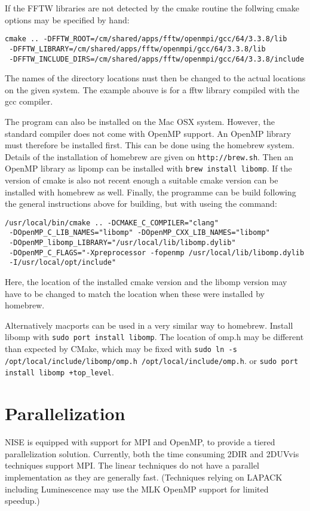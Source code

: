 \documentclass[12pt]{book}
\begin{document}
If the FFTW libraries are not detected by the cmake routine the follwing cmake options may be specified by hand:
\begin{verbatim}
cmake .. -DFFTW_ROOT=/cm/shared/apps/fftw/openmpi/gcc/64/3.3.8/lib
 -DFFTW_LIBRARY=/cm/shared/apps/fftw/openmpi/gcc/64/3.3.8/lib
 -DFFTW_INCLUDE_DIRS=/cm/shared/apps/fftw/openmpi/gcc/64/3.3.8/include
\end{verbatim}
The names of the directory locations nust then be changed to the actual locations on the given system.  The example abouve is for a fftw library compiled with the gcc compiler.

The program can also be installed on the Mac OSX system. However, the standard compiler does not come with OpenMP support. An OpenMP library must therefore be installed first. This can be done using the homebrew system. Details of the installation of homebrew are given on \texttt{http://brew.sh}. Then an OpenMP library as lipomp can be installed with \texttt{brew install libomp}. If the version of cmake is also not recent enough a suitable cmake version can be installed with homebrew as well. Finally, the programme can be build following the general instructions above for building, but with useing the command:\\
\begin{verbatim}
/usr/local/bin/cmake .. -DCMAKE_C_COMPILER="clang"
 -DOpenMP_C_LIB_NAMES="libomp" -DOpenMP_CXX_LIB_NAMES="libomp"
 -DOpenMP_libomp_LIBRARY="/usr/local/lib/libomp.dylib"
 -DOpenMP_C_FLAGS="-Xpreprocessor -fopenmp /usr/local/lib/libomp.dylib
 -I/usr/local/opt/include"
\end{verbatim}
Here, the location of the installed cmake version and the libomp version may have to be changed to match the location when these were installed by homebrew.

Alternatively macports can be used in a very similar way to homebrew. Install libomp with \texttt{sudo port install libomp}. The location of omp.h may be different than expected by CMake, which may be fixed with \texttt{sudo ln -s /opt/local/include/libomp/omp.h /opt/local/include/omp.h}. or \texttt{sudo port install libomp +top\_level}.

\section{Parallelization}
NISE is equipped with support for MPI and OpenMP, to provide a tiered parallelization solution. Currently, both the time consuming 2DIR and 2DUVvis techniques support MPI. The linear techniques do not have a parallel implementation as they are generally fast. (Techniques relying on LAPACK including Luminescence may use the MLK OpenMP support for limited speedup.)
\end{document}
